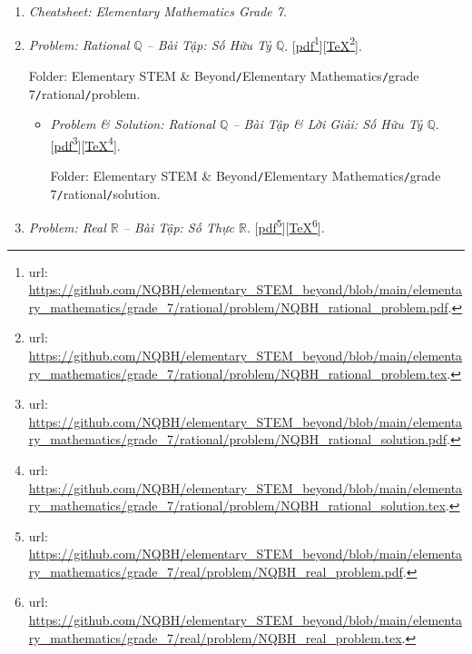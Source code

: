 \documentclass[12pt,twoside]{book}
\begin{document}
\begin{enumerate}
	\item {\it Cheatsheet: Elementary Mathematics Grade 7}.
	
	\item {\it Problem: Rational $\mathbb{Q}$ -- Bài Tập: Số Hữu Tỷ $\mathbb{Q}$}. [\href{https://github.com/NQBH/elementary_STEM_beyond/blob/main/elementary_mathematics/grade_7/rational/problem/NQBH_rational_problem.pdf}{pdf}\footnote{{\sc url}: \url{https://github.com/NQBH/elementary_STEM_beyond/blob/main/elementary_mathematics/grade_7/rational/problem/NQBH_rational_problem.pdf}.}][\href{https://github.com/NQBH/elementary_STEM_beyond/blob/main/elementary_mathematics/grade_7/rational/problem/NQBH_rational_problem.tex}{\TeX}\footnote{{\sc url}: \url{https://github.com/NQBH/elementary_STEM_beyond/blob/main/elementary_mathematics/grade_7/rational/problem/NQBH_rational_problem.tex}.}].
	
	Folder: {\sf Elementary STEM \& Beyond{\tt/}Elementary Mathematics{\tt/}grade 7{\tt/}rational{\tt/}problem}.
	\begin{itemize}
		\item {\it Problem \& Solution: Rational $\mathbb{Q}$ -- Bài Tập \& Lời Giải: Số Hữu Tỷ $\mathbb{Q}$}. [\href{https://github.com/NQBH/elementary_STEM_beyond/blob/main/elementary_mathematics/grade_7/rational/problem/NQBH_rational_solution.pdf}{pdf}\footnote{{\sc url}: \url{https://github.com/NQBH/elementary_STEM_beyond/blob/main/elementary_mathematics/grade_7/rational/problem/NQBH_rational_solution.pdf}.}][\href{https://github.com/NQBH/elementary_STEM_beyond/blob/main/elementary_mathematics/grade_7/rational/problem/NQBH_rational_solution.tex}{\TeX}\footnote{{\sc url}: \url{https://github.com/NQBH/elementary_STEM_beyond/blob/main/elementary_mathematics/grade_7/rational/problem/NQBH_rational_solution.tex}.}].
		
		Folder: {\sf Elementary STEM \& Beyond{\tt/}Elementary Mathematics{\tt/}grade 7{\tt/}rational{\tt/}solution}.
	\end{itemize}
	\item {\it Problem: Real $\mathbb{R}$ -- Bài Tập: Số Thực $\mathbb{R}$}. [\href{https://github.com/NQBH/elementary_STEM_beyond/blob/main/elementary_mathematics/grade_7/real/problem/NQBH_real_problem.pdf}{pdf}\footnote{{\sc url}: \url{https://github.com/NQBH/elementary_STEM_beyond/blob/main/elementary_mathematics/grade_7/real/problem/NQBH_real_problem.pdf}.}][\href{https://github.com/NQBH/elementary_STEM_beyond/blob/main/elementary_mathematics/grade_7/real/problem/NQBH_real_problem.tex}{\TeX}\footnote{{\sc url}: \url{https://github.com/NQBH/elementary_STEM_beyond/blob/main/elementary_mathematics/grade_7/real/problem/NQBH_real_problem.tex}.}].
	

\end{enumerate}
\end{document}
